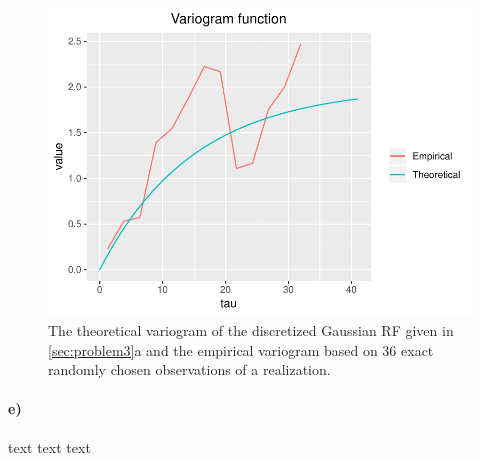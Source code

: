 \begin{figure}
    \centering
    \includegraphics[scale=0.95]{figures/3c_variogram_obs.pdf}
    \caption{The theoretical variogram of the discretized Gaussian RF given in \ref{sec:problem3}a and the empirical variogram based on 36 exact randomly chosen observations of a realization.}
    \label{fig:3c_variogram_obs}
\end{figure}

\paragraph{e)}
text text text
